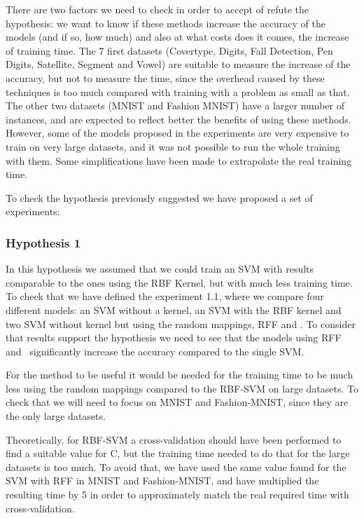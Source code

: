 \begin{pre-delivery}

  There are two factors we need to check in order to accept of refute the
  hypothesis: we want to know if these methods increase the accuracy of the
  models (and if so, how much) and also at what costs does it comes, the
  increase of training time. The 7 first datasets (Covertype, Digits, Fall
  Detection, Pen Digits, Satellite, Segment and Vowel) are suitable to measure
  the increase of the accuracy, but not to measure the time, since the
  overhead caused by these techniques is too much compared with training
  with a problem as small as that. The other two datasets (MNIST and Fashion
  MNIST) have a larger number of instances, and are expected to reflect
  better the benefits of using these methods.
  However, some of the models proposed in the experiments are very expensive to
  train on very large datasets, and it was not possible to run the whole training
  with them. Some simplifications have been made to extrapolate the real
  training time.

  To check the hypothesis previously suggested we have proposed a set of
  experiments:

  \subsubsection*{Hypothesis 1}
  In this hypothesis we assumed that we could train an SVM with results comparable
  to the ones using the RBF Kernel, but with much less training time. To
  check that we have defined the experiment 1.1, where we compare four different
  models: an SVM without a kernel, an SVM with the RBF kernel and two SVM
  without kernel but using the random mappings, RFF and \Nys.
  To consider that results support
  the hypothesis we need to see that the models using RFF and \Nys\ significantly
  increase the accuracy compared to the single SVM.

  For the method to be useful it would be needed for the training time to
  be much less using the random mappings compared to the RBF-SVM on large datasets.
  To check that we will need to focus on MNIST and Fashion-MNIST, since they
  are the only large datasets.

  Theoretically, for RBF-SVM a cross-validation should have been performed to
  find a suitable value for C, but the training time needed to do that for the
  large datasets is too much. To avoid that, we have used the same value found
  for the SVM with RFF in MNIST and Fashion-MNIST,
  and have multiplied the resulting time by 5 in order to approximately match
  the real required time with cross-validation.


\end{pre-delivery}

